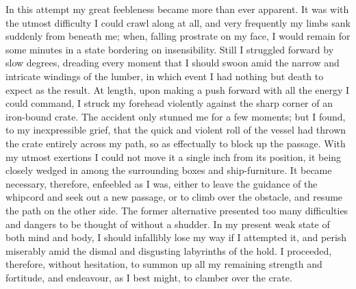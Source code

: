In this attempt my great feebleness became more than ever apparent. It was
with the utmost difficulty I could crawl along at all, and very frequently my
limbs sank suddenly from beneath me; when, falling prostrate on my face, I would
remain for some minutes in a state bordering on insensibility. Still I struggled
forward by slow degrees, dreading every moment that I should swoon amid the
narrow and intricate windings of the lumber, in which event I had nothing but
death to expect as the result. At length, upon making a push forward with all
the energy I could command, I struck my forehead violently against the sharp
corner of an iron-bound crate. The accident only stunned me for a few moments;
but I found, to my inexpressible grief, that the quick and violent roll of the
vessel had thrown the crate entirely across my path, so as effectually to block
up the passage. With my utmost exertions I could not move it a single inch from
its position, it being closely wedged in among the surrounding boxes and
ship-furniture. It became necessary, therefore, enfeebled as I was, either to
leave the guidance of the whipcord and seek out a new passage, or to climb over
the obstacle, and resume the path on the other side. The former alternative
presented too many difficulties and dangers to be thought of without a shudder.
In my present weak state of both mind and body, I should infallibly lose my way
if I attempted it, and perish miserably amid the dismal and disgusting
labyrinths of the hold. I proceeded, therefore, without hesitation, to summon up
all my remaining strength and fortitude, and endeavour, as I best might, to
clamber over the crate. 

